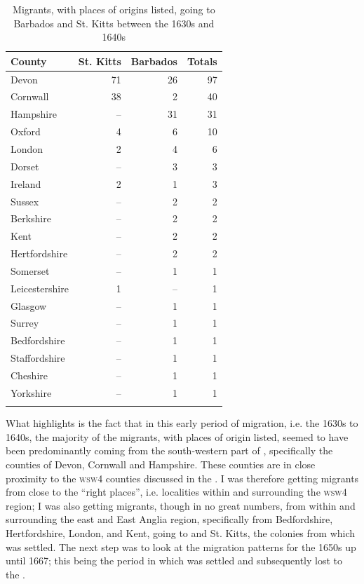 \begin{table}
\begin{tabular}{lrrr}
\lsptoprule 
County & \multicolumn{1}{c}{St. Kitts} & \multicolumn{1}{c}{Barbados} & \multicolumn{1}{c}{Totals}\\
\midrule
Devon & 71 & 26 & 97 \\
Cornwall & 38 & 2 & 40 \\
Hampshire & -- & 31 & 31 \\
Oxford & 4 & 6 & 10 \\
London & 2 & 4 & 6 \\
Dorset & -- & 3 & 3 \\
Ireland & 2 & 1 & 3 \\
Sussex & -- & 2 & 2 \\
Berkshire & -- & 2 & 2 \\
Kent & -- & 2 & 2 \\
Hertfordshire & -- & 2 & 2 \\
Somerset & -- & 1 & 1 \\
Leicestershire & 1 & -- & 1 \\
Glasgow & -- & 1 & 1 \\
Surrey & -- & 1 & 1 \\
Bedfordshire & -- & 1 & 1 \\
Staffordshire & -- & 1 & 1 \\
Cheshire & -- & 1 & 1 \\
Yorkshire & -- & 1 & 1 \\
\lspbottomrule 
\end{tabular}
\caption{Migrants, with places of origins listed, going to Barbados and St. Kitts between the 1630s and 1640s}
\label{Table 6.2}
\end{table}

What  highlights is the fact that in this early period of migration, i.e. the 1630s to 1640s, the majority of the migrants, with places of origin listed, seemed to have been predominantly coming from the south-western part of , specifically the counties of Devon, Cornwall and Hampshire. These counties are in close proximity to the \textsc{wsw4} counties discussed in the . I was therefore getting migrants from close to the ``right places'', i.e. localities within and surrounding the \textsc{wsw4} region; I was also getting migrants, though in no great numbers, from within and surrounding the east and East Anglia  region, specifically from Bedfordshire, Hertfordshire, London, and Kent, going to  and St. Kitts, the colonies from which  was settled. The next step was to look at the migration patterns for the 1650s up until 1667; this being the period in which  was settled and subsequently lost to the .

